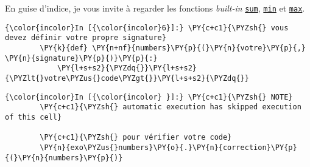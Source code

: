     En guise d'indice, je vous invite à regarder les fonctions
\emph{built-in}
\href{https://docs.python.org/3/library/functions.html\#sum}{\texttt{sum}},
\href{https://docs.python.org/3/library/functions.html\#min}{\texttt{min}}
et
\href{https://docs.python.org/3/library/functions.html\#max}{\texttt{max}}.

    \begin{Verbatim}[commandchars=\\\{\}]
{\color{incolor}In [{\color{incolor}6}]:} \PY{c+c1}{\PYZsh{} vous devez définir votre propre signature}
        \PY{k}{def} \PY{n+nf}{numbers}\PY{p}{(}\PY{n}{votre}\PY{p}{,} \PY{n}{signature}\PY{p}{)}\PY{p}{:}
            \PY{l+s+s2}{\PYZdq{}}\PY{l+s+s2}{\PYZlt{}votre\PYZus{}code\PYZgt{}}\PY{l+s+s2}{\PYZdq{}}
\end{Verbatim}


    \begin{Verbatim}[commandchars=\\\{\}]
{\color{incolor}In [{\color{incolor} }]:} \PY{c+c1}{\PYZsh{} NOTE}
        \PY{c+c1}{\PYZsh{} automatic execution has skipped execution of this cell}
        
        \PY{c+c1}{\PYZsh{} pour vérifier votre code}
        \PY{n}{exo\PYZus{}numbers}\PY{o}{.}\PY{n}{correction}\PY{p}{(}\PY{n}{numbers}\PY{p}{)}
\end{Verbatim}



    
    
    
